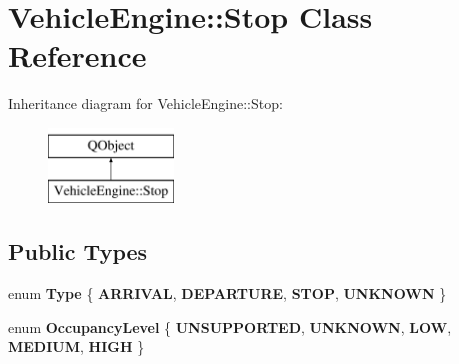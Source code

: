 \hypertarget{classVehicleEngine_1_1Stop}{}\section{Vehicle\+Engine\+:\+:Stop Class Reference}
\label{classVehicleEngine_1_1Stop}
Inheritance diagram for Vehicle\+Engine\+:\+:Stop\+:\begin{figure}[H]
\begin{center}
\leavevmode
\includegraphics[height=2.000000cm]{classVehicleEngine_1_1Stop}
\end{center}
\end{figure}
\subsection*{Public Types}
\begin{DoxyCompactItemize}
\item 
\mbox{\label{classVehicleEngine_1_1Stop_ae0c7ddc417639975e00b58181c3ee458}} 
enum {\bfseries Type} \{ {\bfseries A\+R\+R\+I\+V\+AL}, 
{\bfseries D\+E\+P\+A\+R\+T\+U\+RE}, 
{\bfseries S\+T\+OP}, 
{\bfseries U\+N\+K\+N\+O\+WN}
 \}
\item 
\mbox{\label{classVehicleEngine_1_1Stop_acdfae8b416558c41043261aaa02fdfe6}} 
enum {\bfseries Occupancy\+Level} \{ \newline
{\bfseries U\+N\+S\+U\+P\+P\+O\+R\+T\+ED}, 
{\bfseries U\+N\+K\+N\+O\+WN}, 
{\bfseries L\+OW}, 
{\bfseries M\+E\+D\+I\+UM}, 
\newline
{\bfseries H\+I\+GH}
 \}
\end{DoxyCompactItemize}
